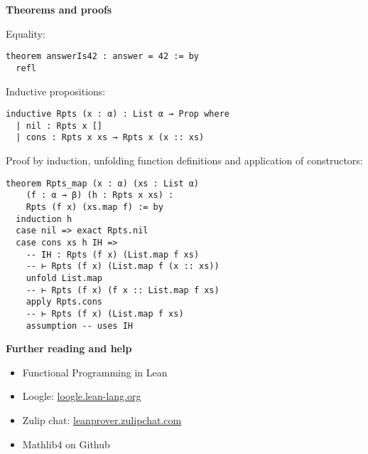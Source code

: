 \documentclass[11pt,DIV=16,parskip=half,headings=normal,abstract]{scrartcl}
\begin{document}
\begin{multicols*}{2}
\textbf{Theorems and proofs}

Equality:
\begin{lstlisting}
theorem answerIs42 : answer = 42 := by
  refl
\end{lstlisting}

\goodbreak

Inductive propositions:
\begin{lstlisting}
inductive Rpts (x : α) : List α → Prop where
  | nil : Rpts x []
  | cons : Rpts x xs → Rpts x (x :: xs)
\end{lstlisting}

Proof by induction, unfolding function definitions and application of constructors:
\begin{lstlisting}
theorem Rpts_map (x : α) (xs : List α)
    (f : α → β) (h : Rpts x xs) :
    Rpts (f x) (xs.map f) := by
  induction h
  case nil => exact Rpts.nil
  case cons xs h IH =>
    -- IH : Rpts (f x) (List.map f xs)
    -- ⊢ Rpts (f x) (List.map f (x :: xs))
    unfold List.map
    -- ⊢ Rpts (f x) (f x :: List.map f xs)
    apply Rpts.cons
    -- ⊢ Rpts (f x) (List.map f xs)
    assumption -- uses IH
\end{lstlisting}


\textbf{Further reading and help}
\begin{itemize}
\item Functional Programming in Lean %
\item Loogle: \href{https://loogle.lean-lang.org/}{loogle.lean-lang.org}
\item Zulip chat: \href{https://leanprover.zulipchat.com/}{leanprover.zulipchat.com}
\item Mathlib4 on Github %
\end{itemize}



\end{multicols*}
\end{document}
